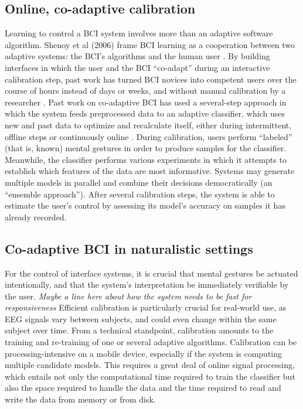 \subsection{Online, co-adaptive calibration}

\noindent Learning to control a BCI system involves more than an adaptive software algorithm. Shenoy et al (2006) frame BCI learning as a cooperation between two adaptive systems: the BCI's algorithms and the human user \cite{shenoy_towards_2006}.  By building interfaces in which the user and the BCI ``co-adapt'' during an interactive calibration step, past work has turned BCI novices into competent users over the course of hours instead of days or weeks, and without manual calibration by a researcher \cite{vidaurre_fully_2006,vidaurre_co-adaptive_2011,vidaurre_machine-learning-based_2011}. 
Past work on co-adaptive BCI has used a several-step approach in which the system feeds preprocessed data to an adaptive classifier, which uses new and past data to optimize and recalculate itself, either during intermittent, offline steps or continuously online \cite{vidaurre_fully_2006,shijian_lu_unsupervised_2009,das_unsupervised_2013}. During calibration, users perform ``labeled'' (that is, known) mental gestures in order to produce samples for the classifier. Meanwhile, the classifier performs various experiments in which it attempts to establish which features of the data are most informative. Systems may generate multiple models in parallel and combine their decisions democratically (an ``ensemble approach''). After several calibration steps, the system is able to estimate the user's control by assessing its model's accuracy on samples it has already recorded.

\subsection{Co-adaptive BCI in naturalistic settings}

\noindent For the control of interface systems, it is crucial that mental gestures be actuated intentionally, and that the system's interpretation be immediately verifiable by the user. \cite{mcfarland_brain-computer_2011} \textit{Maybe a line here about how the system needs to be fast for responsiveness} Efficient calibration is particularly crucial for real-world use, as EEG signals vary between subjects, and could even change within the same subject over time. From a technical standpoint, calibration amounts to the training and re-training of one or several adaptive algorithms. Calibration can be processing-intensive on a mobile device, especially if the system is computing multiple candidate models. This requires a great deal of online signal processing, which entails not only the computational time required to train the classifier but also the space required to handle the data and the time required to read and write the data from memory or from disk.

